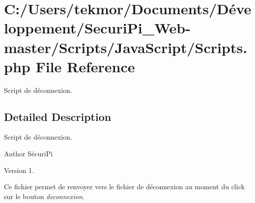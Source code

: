 \section{C\+:/\+Users/tekmor/\+Documents/\+Développement/\+Securi\+Pi\+\_\+\+Web-\/master/\+Scripts/\+Java\+Script/\+Scripts.php File Reference}
\label{_scripts_8php}


Script de d\'{e}connexion.  




\subsection{Detailed Description}
Script de d\'{e}connexion. 

\begin{DoxyAuthor}{Author}
S\'{e}curi\+Pi 
\end{DoxyAuthor}
\begin{DoxyVersion}{Version}
1.
\end{DoxyVersion}
Ce fichier permet de renvoyer vers le fichier de d\'{e}connexion au moment du click sur le bouton {\itshape deconnexion}. 